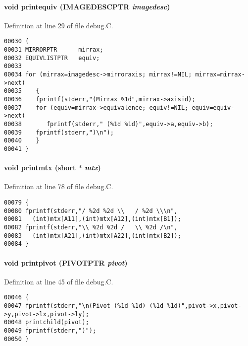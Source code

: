 \paragraph{\setlength{\rightskip}{0pt plus 5cm}void printequiv ({\bf IMAGEDESCPTR} {\em imagedesc})}\hfill



Definition at line 29 of file debug.C.\small\begin{verbatim}00030 {
00031 MIRRORPTR      mirrax;
00032 EQUIVLISTPTR   equiv;
00033 
00034 for (mirrax=imagedesc->mirroraxis; mirrax!=NIL; mirrax=mirrax->next)
00035    {
00036    fprintf(stderr,"(Mirrax %1d",mirrax->axisid);
00037    for (equiv=mirrax->equivalence; equiv!=NIL; equiv=equiv->next)
00038       fprintf(stderr," (%1d %1d)",equiv->a,equiv->b);
00039    fprintf(stderr,")\n");
00040    }
00041 }
\end{verbatim}\normalsize 
\label{debug.C_a4}
\paragraph{\setlength{\rightskip}{0pt plus 5cm}void printmtx (short $\ast$ {\em mtx})}\hfill



Definition at line 78 of file debug.C.\small\begin{verbatim}00079 {
00080 fprintf(stderr,"/ %2d %2d \\   / %2d \\\n",
00081   (int)mtx[A11],(int)mtx[A12],(int)mtx[B1]);
00082 fprintf(stderr,"\\ %2d %2d /   \\ %2d /\n",
00083   (int)mtx[A21],(int)mtx[A22],(int)mtx[B2]);
00084 }
\end{verbatim}\normalsize 
\label{debug.C_a2}
\paragraph{\setlength{\rightskip}{0pt plus 5cm}void printpivot ({\bf PIVOTPTR} {\em pivot})}\hfill



Definition at line 45 of file debug.C.\small\begin{verbatim}00046 {
00047 fprintf(stderr,"\n(Pivot (%1d %1d) (%1d %1d)",pivot->x,pivot->y,pivot->lx,pivot->ly);
00048 printchild(pivot);
00049 fprintf(stderr,")");
00050 }
\end{verbatim}\normalsize 
\label{debug.C_a0}
